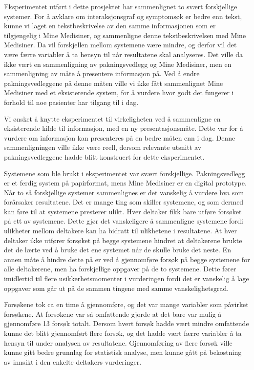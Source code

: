 Eksperimentet utført i dette prosjektet har sammenlignet to svært forskjellige systemer. For å avklare om interaksjonsgraf og symptomsøk er bedre enn tekst, kunne vi laget en tekstbeskrivelse av den samme informasjonen som er tilgjengelig i Mine Medisiner, og sammenligne denne tekstbeskrivelsen med Mine Medisiner. Da vil forskjellen mellom systemene være mindre, og derfor vil det være færre variabler å ta hensyn til når resultatene skal analyseres. Det ville da ikke vært en sammenligning av pakningsvedlegg og Mine Medisiner, men en sammenligning av måte å presentere informasjon på. Ved å endre pakningsvedleggene på denne måten ville vi ikke fått sammenlignet Mine Medisiner med et eksisterende system, for å vurdere hvor godt det fungerer i forhold til noe pasienter har tilgang til i dag. 

Vi ønsket å knytte eksperimentet til virkeligheten ved å sammenligne en eksisterende kilde til informasjon, med en ny presentasjonsmåte. Dette var for å vurdere om informasjon kan presenteres på en bedre måten enn i dag. Denne sammenligningen ville ikke være reell, dersom relevante utsnitt av pakningsvedleggene hadde blitt konstruert for dette eksperimentet.

Systemene som ble brukt i eksperimentet var svært forskjellige. Pakningsvedlegg er et ferdig system på papirformat, mens Mine Medisiner er en digital prototype. Når to så forskjellige systemer sammenlignes er det vanskelig å vurdere hva som forårsaker resultatene. Det er mange ting som skiller systemene, og som dermed kan føre til at systemene presterer ulikt. 
Hver deltaker fikk bare utføre forsøket på ett av systemene. Dette gjør det vanskeligere å sammenligne systemene fordi ulikheter mellom deltakere kan ha bidratt til ulikhetene i resultatene. At hver deltaker ikke utfører forsøket på begge systemene hindret at deltakerene brukte det de lærte ved å bruke det ene systemet når de skulle bruke det neste. En annen måte å hindre dette på er ved å gjennomføre forsøk på begge systemene for alle deltakerene, men ha forskjellige oppgaver på de to systemene. Dette fører imidlertid til flere usikkerhetsmomenter i vurderingen fordi det er vanskelig å lage oppgaver som går ut på de sammen tingene med samme vanskelighetsgrad.

Forsøkene tok ca en time å gjennomføre, og det var mange variabler som påvirket forsøkene. At forsøkene var så omfattende gjorde at det bare var mulig å gjennomføre 13 forsøk totalt. Dersom hvert forsøk hadde vært mindre omfattende kunne det blitt gjennomført flere forsøk, og det hadde vært færre variabler å ta hensyn til under analysen av resultatene. Gjennomføring av flere forsøk ville kunne gitt bedre grunnlag for statistisk analyse, men kunne gått på bekostning av innsikt i den enkelte deltakers vurderinger. 


